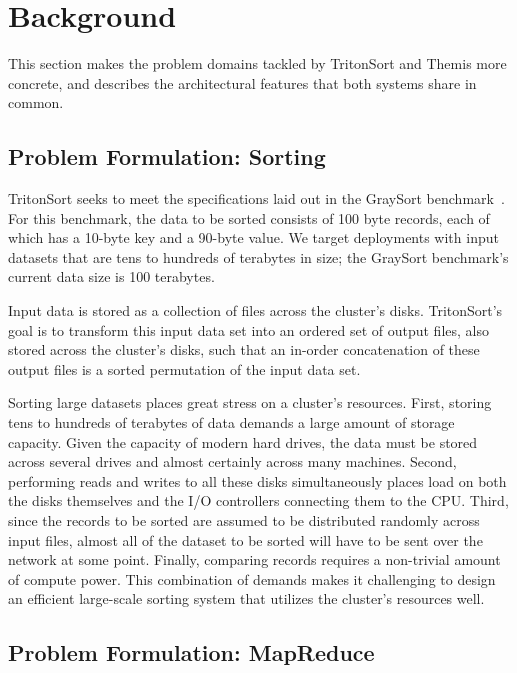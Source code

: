 \chapter{Background}
\label{chapter:background}

This section makes the problem domains tackled by TritonSort and Themis more
concrete, and describes the architectural features that both systems share in
common.

\section{Problem Formulation: Sorting}

TritonSort seeks to meet the specifications laid out in the GraySort
benchmark~\cite{terasort}. For this benchmark, the data to be sorted consists of
100 byte records, each of which has a 10-byte key and a 90-byte value. We
target deployments with input datasets that are tens to hundreds of terabytes
in size; the GraySort benchmark's current data size is 100 terabytes.

Input data is stored as a collection of files across the cluster's
disks. TritonSort's goal is to transform this input data set into an ordered
set of output files, also stored across the cluster's disks, such that an
in-order concatenation of these output files is a sorted permutation of the
input data set.

Sorting large datasets places great stress on a cluster's resources.  First,
storing tens to hundreds of terabytes of data demands a large amount of storage
capacity. Given the capacity of modern hard drives, the data must be stored
across several drives and almost certainly across many machines. Second,
performing reads and writes to all these disks simultaneously places load on
both the disks themselves and the I/O controllers connecting them to the
CPU. Third, since the records to be sorted are assumed to be distributed
randomly across input files, almost all of the dataset to be sorted will have
to be sent over the network at some point. Finally, comparing records requires
a non-trivial amount of compute power. This combination of demands makes it
challenging to design an efficient large-scale sorting system that utilizes the
cluster's resources well.

\section{Problem Formulation: MapReduce}

